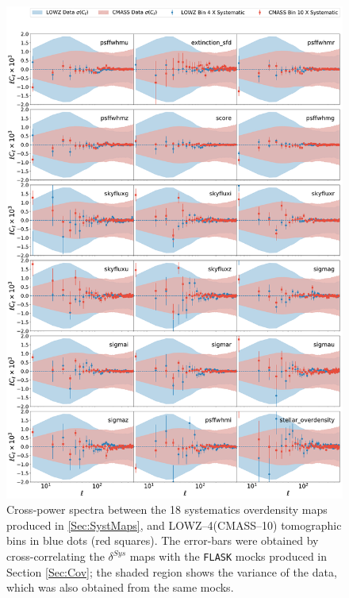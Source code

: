 \begin{figure}
\begin{center}
\includegraphics[width=\textwidth]{BOSS-FIGS/systematics_CMASS_Bin4_LOWZ_Bin4.pdf}
\caption[Cross-power spectra between systematics and LOWZ--4(CMASS--10) tomographic bins.]{Cross-power spectra between the 18 systematics overdensity maps produced in \ref{Sec:SystMaps}, and LOWZ--4(CMASS--10) tomographic bins in blue dots (red squares). The error-bars were obtained by cross-correlating the $\delta^{Sys}$ maps with the \texttt{FLASK} mocks produced in Section \ref{Sec:Cov}; the shaded region shows the variance of the data, which was also obtained from the same mocks.}
\label{fig:SystBin4}
\end{center}
\end{figure}

